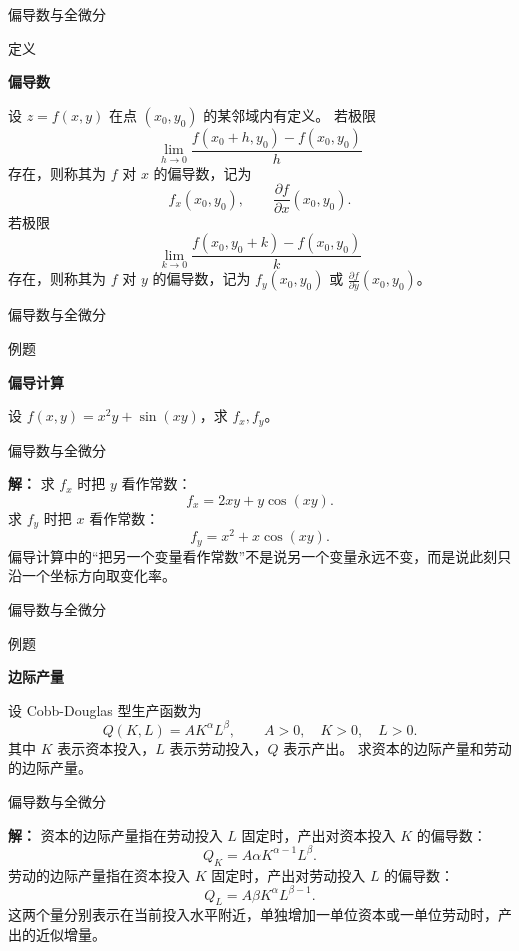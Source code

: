 \documentclass[aspectratio=169,10pt,fontset=fandol]{ctexbeamer}
\begin{document}
\begin{frame}[t,fragile]{偏导数与全微分}
\footnotesize
\begin{block}{定义}
{\footnotesize
\textbf{偏导数}\par

设 $z=f(x,y)$ 在点 $(x_0,y_0)$ 的某邻域内有定义。 若极限
\[
\lim_{h\to0}\frac{f(x_0+h,y_0)-f(x_0,y_0)}{h}
\]
存在，则称其为 $f$ 对 $x$ 的偏导数，记为
\[
f_x(x_0,y_0),\qquad \frac{\partial f}{\partial x}(x_0,y_0).
\]
若极限
\[
\lim_{k\to0}\frac{f(x_0,y_0+k)-f(x_0,y_0)}{k}
\]
存在，则称其为 $f$ 对 $y$ 的偏导数，记为 $f_y(x_0,y_0)$ 或 $\frac{\partial f}{\partial y}(x_0,y_0)$。

}
\end{block}
\end{frame}
\begin{frame}[t,fragile]{偏导数与全微分}
\footnotesize
\begin{block}{例题}
{\footnotesize
\textbf{偏导计算}\par

设 $f(x,y)=x^2y+\sin(xy)$，求 $f_x,f_y$。

}
\end{block}
\end{frame}
\begin{frame}[t,fragile]{偏导数与全微分}
\footnotesize
{\footnotesize
\textbf{解：}
求 $f_x$ 时把 $y$ 看作常数：
\[
f_x=2xy+y\cos(xy).
\]
求 $f_y$ 时把 $x$ 看作常数：
\[
f_y=x^2+x\cos(xy).
\]
偏导计算中的“把另一个变量看作常数”不是说另一个变量永远不变，而是说此刻只沿一个坐标方向取变化率。

}
\end{frame}
\begin{frame}[t,fragile]{偏导数与全微分}
\footnotesize
\begin{block}{例题}
{\footnotesize
\textbf{边际产量}\par

设 Cobb-Douglas 型生产函数为
\[
Q(K,L)=A K^\alpha L^\beta,\qquad A>0,\quad K>0,\quad L>0.
\]
其中 $K$ 表示资本投入，$L$ 表示劳动投入，$Q$ 表示产出。 求资本的边际产量和劳动的边际产量。

}
\end{block}
\end{frame}
\begin{frame}[t,fragile]{偏导数与全微分}
\footnotesize
{\footnotesize
\textbf{解：}
资本的边际产量指在劳动投入 $L$ 固定时，产出对资本投入 $K$ 的偏导数：
\[
Q_K=A\alpha K^{\alpha-1}L^\beta.
\]
劳动的边际产量指在资本投入 $K$ 固定时，产出对劳动投入 $L$ 的偏导数：
\[
Q_L=A\beta K^\alpha L^{\beta-1}.
\]
这两个量分别表示在当前投入水平附近，单独增加一单位资本或一单位劳动时，产出的近似增量。

}
\end{frame}
\end{document}
